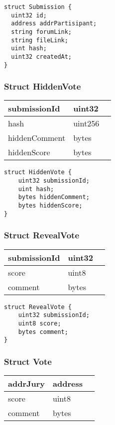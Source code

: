 \begin{lstlisting}[firstnumber=15]
struct Submission {
  uint32 id;
  address addrPartisipant;
  string forumLink;
  string fileLink;
  uint hash;
  uint32 createdAt;
}
\end{lstlisting}

\subsubsection{Struct HiddenVote}


\ifsoltables
\noindent\begin{tabular}{|l|l|p{6cm}|}\hline
submissionId & uint32 & \\\hline
hash & uint256 & \\\hline
hiddenComment & bytes & \\\hline
hiddenScore & bytes & \\\hline
\end{tabular}
\fi


\begin{lstlisting}[firstnumber=24]
struct HiddenVote {
    uint32 submissionId;
    uint hash;
    bytes hiddenComment;
    bytes hiddenScore;
}
\end{lstlisting}

\subsubsection{Struct RevealVote}


\ifsoltables
\noindent\begin{tabular}{|l|l|p{6cm}|}\hline
submissionId & uint32 & \\\hline
score & uint8 & \\\hline
comment & bytes & \\\hline
\end{tabular}
\fi


\begin{lstlisting}[firstnumber=31]
struct RevealVote {
    uint32 submissionId;
    uint8 score;
    bytes comment;
}
\end{lstlisting}

\subsubsection{Struct Vote}


\ifsoltables
\noindent\begin{tabular}{|l|l|p{6cm}|}\hline
addrJury & address & \\\hline
score & uint8 & \\\hline
comment & bytes & \\\hline
\end{tabular}
\fi


